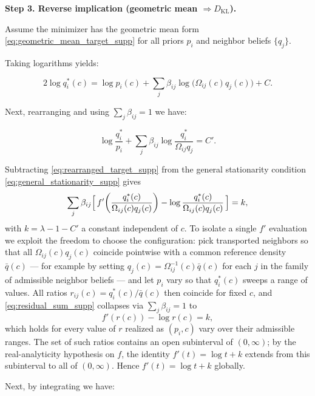 \documentclass[twoside,11pt]{article}
\begin{document}
\textbf{Step 3. Reverse implication (geometric mean $\Rightarrow D_{\mathrm{KL}}$).}

Assume the minimizer has the geometric mean form \eqref{eq:geometric_mean_target_supp} for all priors $p_i$ and neighbor beliefs $\{q_j\}$.

Taking logarithms yields:

\begin{equation}
2\log q_i^*(c) = \log p_i(c) + \sum_j\beta_{ij}\log\bigl(\Omega_{ij}(c) q_j(c)\bigr) + C.
\label{eq:log_target_supp}
\end{equation}

Next, rearranging and using $\sum_j\beta_{ij}=1$ we have:

\begin{equation}
\log\frac{q_i^*}{p_i} + \sum_j\beta_{ij}\log\frac{q_i^*}{\Omega_{ij}q_j} = C'.
\label{eq:rearranged_target_supp}
\end{equation}

Subtracting \eqref{eq:rearranged_target_supp} from the general stationarity condition \eqref{eq:general_stationarity_supp} gives
\begin{equation}
\sum_{j} \beta_{ij}\Bigl[\,f'\!\left(\frac{q_i^*(c)}{\Omega_{ij}(c)q_j(c)}\right) - \log\frac{q_i^*(c)}{\Omega_{ij}(c)q_j(c)}\,\Bigr] = k,
\label{eq:residual_sum_supp}
\end{equation}
with $k = \lambda - 1 - C'$ a constant independent of $c$. To isolate a single $f'$ evaluation we exploit the freedom to choose the configuration: pick transported neighbors so that all $\Omega_{ij}(c) q_j(c)$ coincide pointwise with a common reference density $\bar{q}(c)$ — for example by setting $q_j(c) = \Omega_{ij}^{-1}(c)\bar{q}(c)$ for each $j$ in the family of admissible neighbor beliefs — and let $p_i$ vary so that $q_i^*(c)$ sweeps a range of values. All ratios $r_{ij}(c) = q_i^*(c)/\bar{q}(c)$ then coincide for fixed $c$, and \eqref{eq:residual_sum_supp} collapses via $\sum_j \beta_{ij} = 1$ to
\begin{equation}
f'(r(c)) - \log r(c) = k,
\label{eq:ode_supp}
\end{equation}
which holds for every value of $r$ realized as $(p_i,c)$ vary over their admissible ranges. The set of such ratios contains an open subinterval of $(0,\infty)$; by the real-analyticity hypothesis on $f$, the identity $f'(t) = \log t + k$ extends from this subinterval to all of $(0,\infty)$. Hence $f'(t)=\log t + k$ globally.

Next, by integrating we have:
\end{document}
